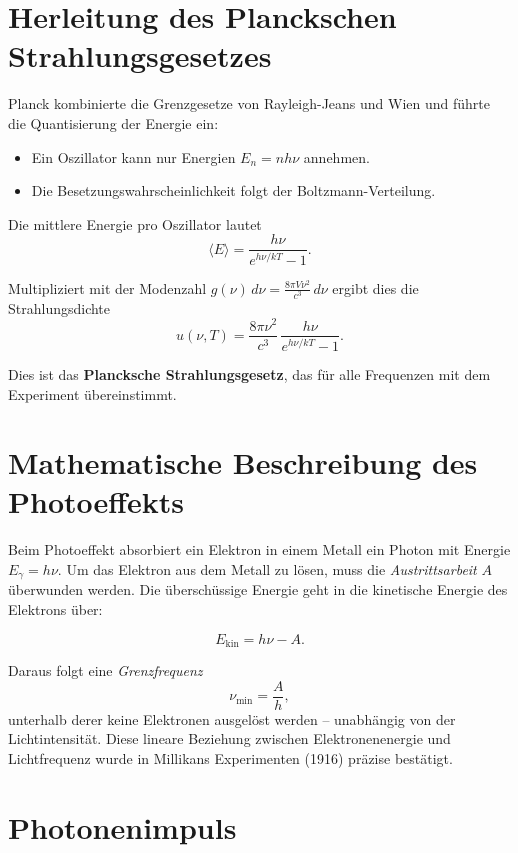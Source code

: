 \section{Herleitung des Planckschen Strahlungsgesetzes}
\label{anhangA:planck}

Planck kombinierte die Grenzgesetze von Rayleigh-Jeans und Wien und
führte die Quantisierung der Energie ein:

\begin{itemize}
	\item Ein Oszillator kann nur Energien $E_n = nh\nu$ annehmen.
	\item Die Besetzungswahrscheinlichkeit folgt der Boltzmann-Verteilung.
\end{itemize}

Die mittlere Energie pro Oszillator lautet
\[
\langle E \rangle = \frac{h\nu}{e^{h\nu/kT} - 1}.
\]

Multipliziert mit der Modenzahl
$g(\nu)\, d\nu = \tfrac{8\pi V \nu^2}{c^3}\, d\nu$
ergibt dies die Strahlungsdichte
\[
u(\nu, T) = \frac{8\pi \nu^2}{c^3}\,
\frac{h\nu}{e^{h\nu/kT} - 1}.
\]

Dies ist das \textbf{Plancksche Strahlungsgesetz}, das für alle Frequenzen
mit dem Experiment übereinstimmt.

\section{Mathematische Beschreibung des Photoeffekts}
\label{anhangA:photoeffekt}

Beim Photoeffekt absorbiert ein Elektron in einem Metall ein Photon
mit Energie $E_\gamma = h\nu$. Um das Elektron aus dem Metall zu lösen,
muss die \emph{Austrittsarbeit} $A$ überwunden werden. Die überschüssige
Energie geht in die kinetische Energie des Elektrons über:

\[
E_\text{kin} = h\nu - A.
\]

Daraus folgt eine \emph{Grenzfrequenz}
\[
\nu_\text{min} = \frac{A}{h},
\]
unterhalb derer keine Elektronen ausgelöst werden – unabhängig von der
Lichtintensität. Diese lineare Beziehung zwischen Elektronenenergie und
Lichtfrequenz wurde in Millikans Experimenten (1916) präzise bestätigt.
\section{Photonenimpuls}
\label{anhangA:impuls}

